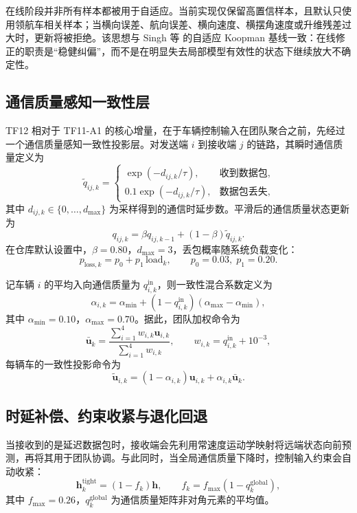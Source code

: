 \documentclass[twocolumn,3p,times,procedia]{elsarticle}
\newcommand{\tfone}{TF11-A1}
\newcommand{\tftwo}{TF12}
\begin{document}
在线阶段并非所有样本都被用于自适应。当前实现仅保留高置信样本，且默认只使用领航车相关样本；当横向误差、航向误差、横向速度、横摆角速度或升维残差过大时，更新将被拒绝。该思想与 Singh 等 \cite{singh2024adaptive} 的自适应 Koopman 基线一致：在线修正的职责是“稳健纠偏”，而不是在明显失去局部模型有效性的状态下继续放大不确定性。

\subsection{通信质量感知一致性层}
\tftwo{} 相对于 \tfone{} 的核心增量，在于车辆控制输入在团队聚合之前，先经过一个通信质量感知一致性投影层。对发送端 $i$ 到接收端 $j$ 的链路，其瞬时通信质量定义为
\begin{equation}
\tilde{q}_{ij,k}=
\begin{cases}
\exp(-d_{ij,k}/\tau), & \text{收到数据包},\\
0.1\exp(-d_{ij,k}/\tau), & \text{数据包丢失},
\end{cases}
\end{equation}
其中 $d_{ij,k}\in\{0,\ldots,d_{\max}\}$ 为采样得到的通信时延步数。平滑后的通信质量状态更新为
\begin{equation}
q_{ij,k}=\beta q_{ij,k-1}+(1-\beta)\tilde{q}_{ij,k}.
\label{eq:zh_q_update}
\end{equation}
在仓库默认设置中，$\beta=0.80$，$d_{\max}=3$，丢包概率随系统负载变化：
\begin{equation}
p_{\text{loss},k}=p_0+p_1\,\mathrm{load}_k,\qquad p_0=0.03,\; p_1=0.20.
\end{equation}

记车辆 $i$ 的平均入向通信质量为 $q^{\text{in}}_{i,k}$，则一致性混合系数定义为
\begin{equation}
\alpha_{i,k}=\alpha_{\min}+\left(1-q^{\text{in}}_{i,k}\right)\left(\alpha_{\max}-\alpha_{\min}\right),
\label{eq:zh_blend}
\end{equation}
其中 $\alpha_{\min}=0.10$，$\alpha_{\max}=0.70$。据此，团队加权命令为
\begin{equation}
\bar{\bm{u}}_k=\frac{\sum_{i=1}^{4} w_{i,k}\bm{u}_{i,k}}{\sum_{i=1}^{4}w_{i,k}},
\qquad
w_{i,k}=q^{\text{in}}_{i,k}+10^{-3},
\end{equation}
每辆车的一致性投影命令为
\begin{equation}
\tilde{\bm{u}}_{i,k}=(1-\alpha_{i,k})\bm{u}_{i,k}+\alpha_{i,k}\bar{\bm{u}}_{k}.
\label{eq:zh_consensus_projection}
\end{equation}

\subsection{时延补偿、约束收紧与退化回退}
当接收到的是延迟数据包时，接收端会先利用常速度运动学映射将远端状态向前预测，再将其用于团队协调。与此同时，当全局通信质量下降时，控制输入约束会自动收紧：
\begin{equation}
\bm{h}_{k}^{\text{tight}}=(1-f_k)\bm{h},\qquad
f_k=f_{\max}(1-q^{\text{global}}_k),
\end{equation}
其中 $f_{\max}=0.26$，$q^{\text{global}}_k$ 为通信质量矩阵非对角元素的平均值。
\end{document}
